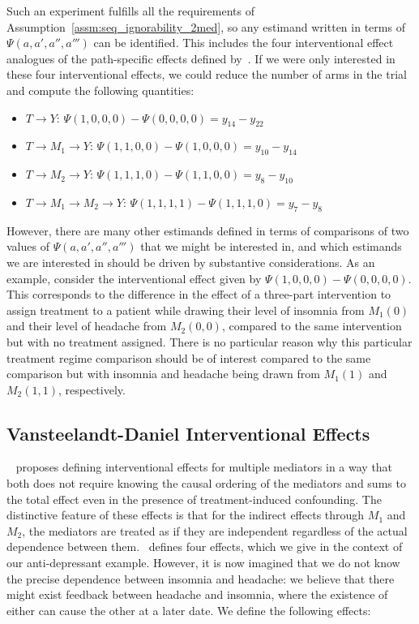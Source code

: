 Such an experiment fulfills all the requirements of Assumption~\ref{assm:seq_ignorability_2med}, so any
estimand written in terms of $\Psi(a,a',a'',a''')$ can be identified. This includes the four interventional 
effect analogues of the path-specific effects defined by~\cite{linvanderweele2017}. If we were only interested in 
these four interventional effects, we could reduce the number of arms in the trial and compute the 
following quantities: 
\begin{itemize}[noitemsep,topsep=0pt]
	\item $T \rightarrow Y$: $\Psi(1,0,0,0) - \Psi(0,0,0,0) = y_{14} - y_{22}$
	\item $T \rightarrow M_{1} \rightarrow Y$: $\Psi(1,1,0,0) - \Psi(1,0,0,0) = y_{10} - y_{14}$
	\item $T \rightarrow M_{2} \rightarrow Y$: $\Psi(1,1,1,0) - \Psi(1,1,0,0) = y_{8} - y_{10}$
	\item $T \rightarrow M_{1} \rightarrow M_{2} \rightarrow Y$: $\Psi(1,1,1,1) - \Psi(1,1,1,0) = y_{7} - y_{8}$
\end{itemize}

However, there are many 
other estimands defined in terms of comparisons of two values of $\Psi(a,a',a'',a''')$ that we might
be interested in, and which estimands we are interested in should
be driven by substantive considerations. As an example, consider the interventional effect given by 
$\Psi(1,0,0,0) - \Psi(0,0,0,0)$. This corresponds to the difference in the effect of a three-part intervention
to assign treatment to a patient while drawing their level of insomnia from $M_{1}(0)$ and their level of 
headache from $M_{2}(0,0)$, compared to the same intervention but with no treatment assigned. There is no 
particular reason why this particular treatment regime comparison should be of interest compared to the 
same comparison but with insomnia and headache being drawn from $M_{1}(1)$ and $M_{2}(1,1)$, respectively. 


\subsection{Vansteelandt-Daniel Interventional Effects}

~\cite{vansteelandtdaniel2017} proposes defining interventional effects for multiple mediators in
a way that both does not require knowing the causal ordering of the mediators and sums to the total
effect even in the presence of treatment-induced confounding. The distinctive feature of these effects
is that for the indirect effects through $M_{1}$ and $M_{2}$, the mediators are treated as if they
are independent regardless of the actual dependence between them.~\cite{vansteelandtdaniel2017} 
defines four effects, which we give in the context of our anti-depressant example. However, it
is now imagined that we do not know the precise dependence between insomnia and headache: we 
believe that there might exist feedback between headache and insomnia, where the existence of 
either can cause the other at a later date. We define the following effects: 

